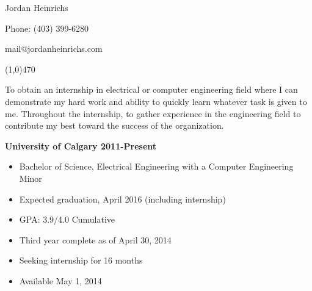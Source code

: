 \documentclass[12pt]{article} %
\begin{document}

\centerline{{\Huge \sc Jordan Heinrichs}}  %
\centerline{Phone: (403) 399-6280} %
\centerline{mail@jordanheinrichs.com}
\noindent
\line(1,0){470}\\

\medskip
{} %
\medskip %

\noindent To obtain an internship in electrical or computer engineering field where I can demonstrate my hard work and ability to quickly learn whatever task is given to me. Throughout the internship, to gather experience in the engineering field to contribute my best toward the success of the organization.  

  \bigskip
{}
\medskip

\noindent \centerline{ \bf University of Calgary \hfill 2011-Present}
\begin{itemize}[noitemsep,parsep=0pt,partopsep=0pt] %
  \item Bachelor of Science, Electrical Engineering with a Computer Engineering Minor
  \item Expected graduation, April 2016 (including internship)
  \item GPA: 3.9/4.0 Cumulative
\end{itemize}


\bigskip %
\medskip

\noindent
\begin{itemize}[noitemsep]
\item Third year complete as of April 30, 2014
\item Seeking internship for 16 months
\item Available May 1, 2014
\end{itemize}
\end{document}
